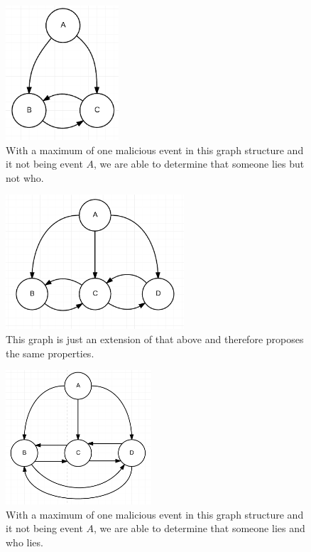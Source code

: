 \begin{figure}[H]
	\centering
	\includegraphics[height=5cm]{figures/GraphStructure_OneToTwo}
	\caption{With a maximum of one malicious event in this graph structure and it not being event $A$, we are able to determine that someone lies but not who.}
\end{figure}

\begin{figure}[H]
	\centering
	\includegraphics[height=5cm]{figures/GraphStructure_OneToTwoChain}
	\caption{This graph is just an extension of that above and therefore proposes the same properties.}
\end{figure}

\begin{figure}[H]
	\centering
	\includegraphics[height=5cm]{figures/GraphStructure_OneToThree}
	\caption{With a maximum of one malicious event in this graph structure and it not being event $A$, we are able to determine that someone lies and who lies.}
\end{figure}

